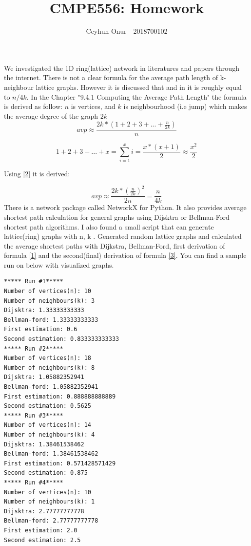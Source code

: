 \documentclass[11pt]{article}
\begin{document}
\author{Ceyhun Onur - 2018700102}
\title{CMPE556: Homework}
\maketitle

\medskip
We investigated the 1D ring(lattice) network in literatures and papers through the internet. There is not a clear formula for the average path length of k-neighbour lattice graphs. However it is discussed that \cite{article} and in \cite{ShenOrrChapter9G} it is roughly equal to $n/4k$. In the \cite{ShenOrrChapter9G} Chapter "9.4.1  Computing the Average Path Length" the formula is derived as follow: 
$n$ is vertices, and $k$ is neighbourhood (i.e jump) which makes the average degree of the graph $2k$
\begin{equation}
\label{1}
    avp \approx \frac{2k * (1 + 2 + 3 + ... + \frac{n}{2k})}{n}
\end{equation}

\begin{equation}
\label{2}
    1 + 2 + 3 + ... + x = \sum_{i=1}^{x} i = \frac{x*(x+1)}{2} \approx \frac{x^2}{2}
\end{equation}

Using \eqref{2} it is derived:

\begin{equation}
\label{3}
    avp \approx \frac{2k * (\frac{n}{2k})^2}{2n} = \frac{n}{4k}
\end{equation}
 \newline
There is a network package called NetworkX \cite{ntx} for Python. It also provides average shortest path calculation for general graphs using Dijsktra or Bellman-Ford shortest path algorithms. I also found a small script that can generate lattice(ring) graphs with n, k \cite{tc}. Generated random lattice graphs and calculated the average shortest paths with Dijkstra, Bellman-Ford, first derivation of formula \eqref{1} and the second(final) derivation of formula \eqref{3}. You can find a sample run on below with visualized graphs.

\pagebreak
\begin{verbatim}
***** Run #1*****
Number of vertices(n): 10
Number of neighbours(k): 3
Dijsktra: 1.33333333333
Bellman-ford: 1.33333333333
First estimation: 0.6
Second estimation: 0.833333333333
***** Run #2*****
Number of vertices(n): 18
Number of neighbours(k): 8
Dijsktra: 1.05882352941
Bellman-ford: 1.05882352941
First estimation: 0.888888888889
Second estimation: 0.5625
***** Run #3*****
Number of vertices(n): 14
Number of neighbours(k): 4
Dijsktra: 1.38461538462
Bellman-ford: 1.38461538462
First estimation: 0.571428571429
Second estimation: 0.875
***** Run #4*****
Number of vertices(n): 10
Number of neighbours(k): 1
Dijsktra: 2.77777777778
Bellman-ford: 2.77777777778
First estimation: 2.0
Second estimation: 2.5
\end{verbatim}
\end{document}
